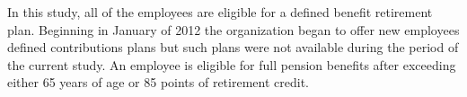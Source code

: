 \documentclass[12pt,letterpaper]{article}
\begin{document}
In this study, all of the employees are eligible for a defined benefit retirement plan. Beginning in January of 2012 the organization began to offer new employees defined contributions plans but such plans were not available during the period of the current study. An employee is eligible for full pension benefits after exceeding either 65 years of age or 85 points of retirement credit.  %


\end{document}
